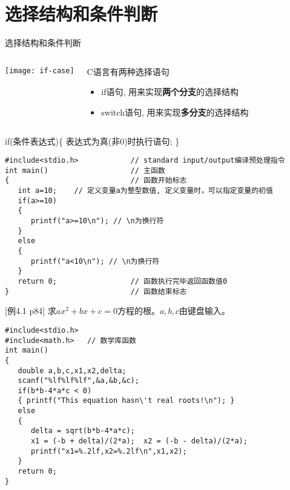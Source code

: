 
\section{选择结构和条件判断}

\begin{frame}{选择结构和条件判断}
\begin{columns}
	\texttt{[image: if-case]}
	\begin{block}{C语言有两种选择语句}
		\begin{itemize}
			\item if语句, 用来实现\textbf{两个分支}的选择结构
			\item switch语句, 用来实现\textbf{多分支}的选择结构
		\end{itemize}
	\end{block}
\end{columns}
\end{frame}

\begin{frame}[fragile]{if(条件表达式)\{ 表达式为真(非0)时执行语句; \}}
\begin{lstlisting}
#include<stdio.h>            // standard input/output编译预处理指令
int main()                   // 主函数
{                            // 函数开始标志
   int a=10;    // 定义变量a为整型数值, 定义变量时，可以指定变量的初值
   if(a>=10)
   {
      printf("a>=10\n"); // \n为换行符
   }
   else
   {
      printf("a<10\n"); // \n为换行符
   }
   return 0;                 // 函数执行完毕返回函数值0
}                            // 函数结束标志
\end{lstlisting}
\end{frame}

\begin{frame}{\small [例4.1 p84] 求$ax^2+bx+c=0$方程的根。$a,b,c$由键盘输入。}
\vspace{-0.2cm}
\begin{lstlisting}
#include<stdio.h>
#include<math.h>   // 数学库函数        
int main()                   
{  
   double a,b,c,x1,x2,delta;
   scanf("%lf%lf%lf",&a,&b,&c);
   if(b*b-4*a*c < 0) 
   { printf("This equation hasn\'t real roots!\n"); }
   else
   {
      delta = sqrt(b*b-4*a*c);
      x1 = (-b + delta)/(2*a);  x2 = (-b - delta)/(2*a);
      printf("x1=%.2lf,x2=%.2lf\n",x1,x2);
   }
   return 0;           
}                            
\end{lstlisting}
\end{frame}


